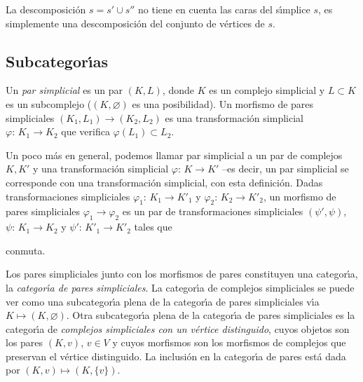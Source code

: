 \begin{obsSubcomplejoPleno}\label{obs:subcomplejopleno}
	La descomposici\'{o}n $s=s'\cup s''$ no tiene en cuenta las caras
	del s\'{\i}mplice $s$, es simplemente una descomposici\'{o}n del
	conjunto de v\'{e}rtices de $s$.
\end{obsSubcomplejoPleno}

\subsection{Subcategor\'{\i}as}
Un \emph{par simplicial} es un par $(K,L)$, donde $K$ es un complejo
simplicial y $L\subset K$ es un subcomplejo ($(K,\varnothing)$ es una
posibilidad). Un morfismo de pares simpliciales
$(K_{1},L_{1})\rightarrow (K_{2},L_{2})$ es una transformaci\'{o}n
simplicial $\varphi:\,K_{1}\rightarrow K_{2}$ que verifica
$\varphi(L_{1})\subset L_{2}$.

\begin{obsParesSimpliciales}
	\label{obs:paressimpliciales}
	Un poco m\'{a}s en general, podemos llamar par simplicial a
	un par de complejos $K,K'$ y una transformaci\'{o}n simplicial
	$\varphi:\,K\rightarrow K'$ --es decir, un par simplicial se
	corresponde con una transformaci\'{o}n simplicial, con esta
	definici\'{o}n. Dadas transformaciones simpliciales
	$\varphi_{1}:\,K_{1}\rightarrow K'_{1}$ y
	$\varphi_{2}:\,K_{2}\rightarrow K'_{2}$, un morfismo de pares
	simpliciales $\varphi_{1}\rightarrow\varphi_{2}$ es un
	par de transformaciones simpliciales $(\psi',\psi)$,
	$\psi:\,K_{1}\rightarrow K_{2}$ y $\psi':\,K'_{1}\rightarrow K'_{2}$
	tales que
	\begin{center}
	\end{center}
	conmuta.
\end{obsParesSimpliciales}

Los pares simpliciales junto con los morfismos de pares constituyen una
categor\'{\i}a, la \emph{categor\'{\i}a de pares simpliciales}.
La categor\'{\i}a de complejos simpliciales se puede ver como una
subcategor\'{\i}a plena de la categor\'{\i}a de pares simpliciales
v\'{\i}a $K\mapsto (K,\varnothing)$. Otra subcategor\'{\i}a plena de la
categor\'{\i}a de pares simpliciales es la categor\'{\i}a de \emph{complejos %
simpliciales con un v\'{e}rtice distinguido}, cuyos objetos
son los pares $(K,v)$, $v\in V$ y cuyos morfismos son los morfismos de
complejos que preservan el v\'{e}rtice distinguido. La inclusi\'{o}n
en la categor\'{\i}a de pares est\'{a} dada por $(K,v)\mapsto (K,\{v\})$.

